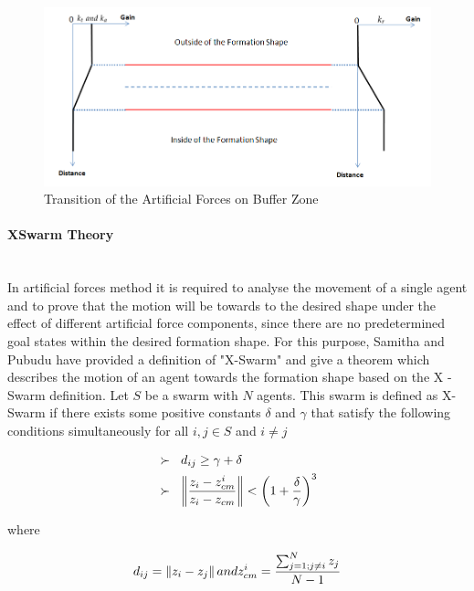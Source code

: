 \begin{figure}[H]
\caption{Transition of the Artificial Forces on Buffer Zone}
\centering
\includegraphics[scale = 0.50]{buffer_zone}
\end{figure}
			
			
\paragraph{XSwarm Theory}\hspace{0pt} \\
In artificial forces method it is required to analyse the movement of a single agent and to prove that the motion will be towards to the desired shape under the effect of different artificial force components, since there are no predetermined goal states within the desired formation shape. For this purpose, Samitha and Pubudu \cite{17} have provided a definition of "X-Swarm" and give a theorem which describes the motion of an agent towards the formation shape based on the X -Swarm definition. Let $S$ be a swarm with $N$ agents. This swarm is defined as X-Swarm if there exists some positive constants $\delta$ and  $ \gamma$ that satisfy the following conditions simultaneously for all $i,j \in S$ and $i \neq j$
			
\begin{align}
\begin{split}
&\succ\hspace{0.2cm}  d_{ij} \geq \gamma + \delta \\
&\succ \hspace{0.2cm}   \left\lVert\frac{z_i - z_{cm}^i}{z_i - z_{cm}}\right\rVert < \left(1+\frac{\delta}{\gamma}\right)^3
\end{split}
\end{align}

where

\begin{equation}
 d_{ij} = \left\lVert z_i - z_j\right\rVert and z_{cm}^i = \frac{\sum_{j=1; j\neq i}^{N} z_j}{N-1}
\end{equation}

